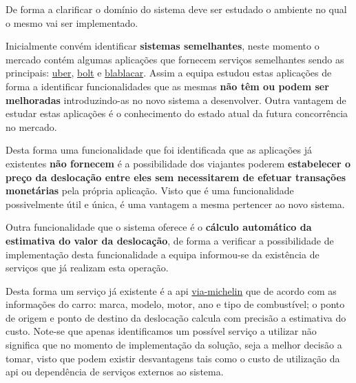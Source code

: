 \hspace{5mm} De forma a clarificar o domínio do sistema deve ser estudado o ambiente no qual o mesmo vai ser implementado.

\hspace{5mm} Inicialmente convém identificar \textbf{sistemas semelhantes}, neste momento o mercado contém algumas aplicações que fornecem serviços semelhantes sendo as principais: \textcolor{blue}{\href{https://www.uber.com}{uber}}, \textcolor{blue}{\href{https://bolt.eu}{bolt}} e \textcolor{blue}{\href{https://www.blablacar.pt/}{blablacar}}. Assim a equipa estudou estas aplicações de forma a identificar funcionalidades que as mesmas \textbf{não têm ou podem ser melhoradas} introduzindo-as no novo sistema a desenvolver. Outra vantagem de estudar estas aplicações é o conhecimento do estado atual da futura concorrência no mercado.

\hspace{5mm} Desta forma uma funcionalidade que foi identificada que as aplicações já existentes \textbf{não fornecem} é a possibilidade dos viajantes poderem \textbf{estabelecer o preço da deslocação entre eles sem necessitarem de efetuar transações monetárias} pela própria aplicação. Visto que é uma funcionalidade possivelmente útil e única, é uma vantagem a mesma pertencer ao novo sistema. 

\hspace{5mm} Outra funcionalidade que o sistema oferece é o \textbf{cálculo automático da estimativa do valor da deslocação}, de forma a verificar a possibilidade de implementação desta funcionalidade a equipa informou-se da existência de serviços que já realizam esta operação.

\hspace{5mm} Desta forma um serviço já existente é a api \textcolor{blue}{\href{https://api.viamichelin.com}{via-michelin}} que de acordo com as informações do carro: marca, modelo, motor, ano e tipo de combustível; o ponto de origem e ponto de destino da deslocação calcula com precisão a estimativa do custo. Note-se que apenas identificamos um possível serviço a utilizar não significa que no momento de implementação da solução, seja a melhor decisão a tomar, visto que podem existir desvantagens tais como o custo de utilização da api ou dependência de serviços externos ao sistema.








